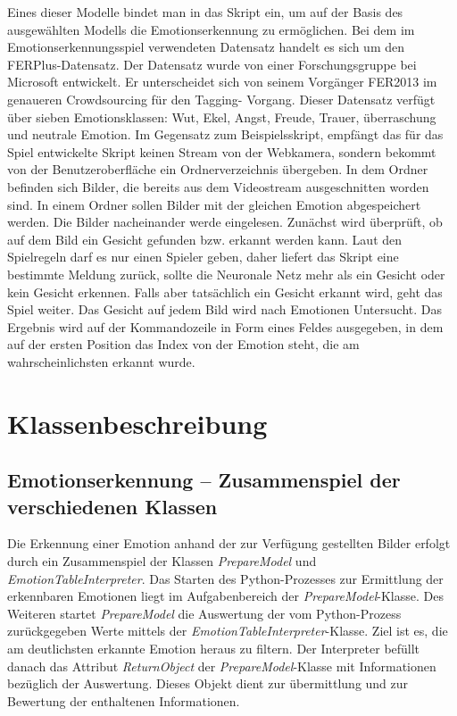 \documentclass[10pt,a4paper]{report}
\begin{document}
Eines dieser Modelle  bindet man in das Skript ein, um auf der Basis des ausgew\"{a}hlten Modells die Emotionserkennung zu erm\"{o}glichen. Bei dem im Emotionserkennungsspiel verwendeten Datensatz 
handelt es sich um den FERPlus-Datensatz. 
 \cite{LeweOhlsen} Der Datensatz wurde
von einer Forschungsgruppe bei Microsoft entwickelt. Er unterscheidet sich
von seinem Vorg\"{a}nger FER2013 im genaueren Crowdsourcing f\"{u}r den Tagging-
Vorgang.
 \cite{RamakrishnanPandeyKarmakarSaha} 
Dieser Datensatz verf\"{u}gt \"{u}ber sieben Emotionsklassen: Wut, Ekel,
Angst, Freude, Trauer, \"{u}berraschung und neutrale Emotion.
Im Gegensatz zum Beispielsskript, empf\"{a}ngt das f\"{u}r das Spiel entwickelte Skript 
keinen Stream von der Webkamera, sondern bekommt von der Benutzeroberfl\"{a}che
ein Ordnerverzeichnis \"{u}bergeben. In dem Ordner befinden sich Bilder, die bereits
aus dem Videostream ausgeschnitten worden sind. 
In einem Ordner sollen Bilder mit der gleichen Emotion abgespeichert werden. Die Bilder nacheinander werde
eingelesen.
Zun\"{a}chst wird \"{u}berpr\"{u}ft, ob auf dem Bild ein Gesicht gefunden bzw.
erkannt werden kann. Laut den Spielregeln darf es nur einen Spieler geben,
daher liefert das Skript eine bestimmte Meldung zur\"{u}ck, sollte die Neuronale Netz mehr als ein Gesicht oder kein
Gesicht erkennen. Falls aber
tats\"{a}chlich ein Gesicht erkannt wird, geht das Spiel weiter. Das Gesicht auf
jedem Bild wird nach Emotionen Untersucht. Das Ergebnis wird auf der Kommandozeile
in Form eines Feldes ausgegeben, in dem auf der ersten Position das
Index von der Emotion steht, die am wahrscheinlichsten erkannt wurde.
\chapter{Klassenbeschreibung}
\section{Emotionserkennung – Zusammenspiel der verschiedenen Klassen}
Die Erkennung einer Emotion anhand der zur Verf\"{u}gung gestellten Bilder erfolgt durch ein Zusammenspiel der Klassen \textit{PrepareModel} und \textit{EmotionTableInterpreter}. Das Starten des Python-Prozesses zur Ermittlung der erkennbaren Emotionen liegt im Aufgabenbereich der \textit{PrepareModel}-Klasse. Des Weiteren startet \textit{PrepareModel} die Auswertung der vom Python-Prozess zur\"{u}ckgegeben Werte mittels der \textit{EmotionTableInterpreter}-Klasse. Ziel ist es, die am deutlichsten erkannte Emotion heraus zu filtern. Der Interpreter bef\"{u}llt danach das Attribut \textit{ReturnObject} der \textit{PrepareModel}-Klasse mit Informationen bez\"{u}glich der Auswertung. Dieses Objekt dient zur \"{u}bermittlung und zur Bewertung der enthaltenen Informationen.
\end{document}
